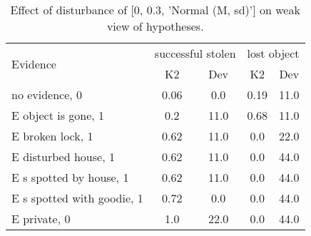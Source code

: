 \begin{table}\begin{tabular}{l|cc|cc}\toprule\multirow{2}{*}{Evidence} & \multicolumn{2}{c}{successful stolen}& \multicolumn{2}{c}{lost object}\\& {K2} & {Dev}& {K2} & {Dev}\\\midrule
no evidence, 0 & \cellcolor{Bittersweet}0.06&\cellcolor{Bittersweet}0.0&\cellcolor{Bittersweet}0.19&\cellcolor{Bittersweet}11.0\\E object is gone, 1 & \cellcolor{Bittersweet}0.2&\cellcolor{Bittersweet}11.0&\cellcolor{Bittersweet}0.68&\cellcolor{Bittersweet}11.0\\E broken lock, 1 & \cellcolor{Bittersweet}0.62&\cellcolor{Bittersweet}11.0&\cellcolor{Bittersweet}0.0&\cellcolor{Bittersweet}22.0\\E disturbed house, 1 & \cellcolor{Bittersweet}0.62&\cellcolor{Bittersweet}11.0&\cellcolor{Bittersweet}0.0&\cellcolor{Bittersweet}44.0\\E s spotted by house, 1 & \cellcolor{Bittersweet}0.62&\cellcolor{Bittersweet}11.0&\cellcolor{Bittersweet}0.0&\cellcolor{Bittersweet}44.0\\E s spotted with goodie, 1 & \cellcolor{Bittersweet}0.72&\cellcolor{Bittersweet}0.0&\cellcolor{Bittersweet}0.0&\cellcolor{Bittersweet}44.0\\E private, 0 & \cellcolor{Bittersweet}1.0&\cellcolor{Bittersweet}22.0&\cellcolor{Bittersweet}0.0&\cellcolor{Bittersweet}44.0\\\bottomrule\end{tabular}\caption{Effect of disturbance of [0, 0.3, 'Normal (M, sd)'] on weak view of hypotheses.}\end{table}